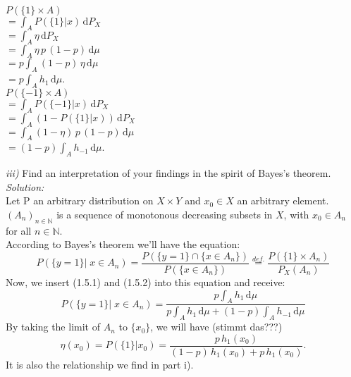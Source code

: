 \documentclass{article}
\begin{document}
\begin{multicols}{2}
\indent \indent \indent $ P( \{1\} \times A ) $ \vspace*{0.5em} \\
\indent \indent $= \displaystyle{ \int_A P(\{1\} | x )\, \text{d}  P_X }$\vspace*{0.5em}\\
\indent \indent $\displaystyle{= \int_A \eta \, \text{d} P_X }$\vspace*{0.5em}\\
\indent \indent $\displaystyle{= \int_A \eta\, p\, (1-p)\, \text{d} \mu }$\vspace*{0.5em}\\
\indent \indent $\displaystyle{= p\int_A (1-p)\, \eta \, \text{d} \mu }$\vspace*{0.5em}\\
\indent \indent $\displaystyle{= p \int_A h_1\, \text{d} \mu } $.\\
\indent \indent \indent  $ P( \{-1\} \times A ) $\vspace*{0.5em}\\
\indent \indent $= \displaystyle{ \int_A P(\{-1\} | x )\, \text{d}  P_X }$\vspace*{0.5em}\\
\indent \indent $= \displaystyle{ \int_A (1-P(\{1\} | x )  ) \, \text{d} P_X }$\vspace*{0.5em}\\
\indent \indent  $= \displaystyle{ \int_A (1- \eta)\, p\, (1-p)\, \text{d} \mu  } $\vspace*{0.5em}\\
\indent \indent $= \displaystyle{ (1-p)\int_A h_{-1} \, \text{d} \mu   }$.\\
\end{multicols}

\noindent\textsl{iii)} Find an interpretation of your findings in the spirit of Bayes's theorem. \\
\textsl{Solution:}\\
Let P an arbitrary distribution on $X \times Y$ and  $x_0 \in X$ an arbitrary element.\\ 
$(A_n)_{n \in \mathbb{N}}$ is a sequence of monotonous decreasing subsets in $X$, with $x_0 \in A_n$ for all $n \in \mathbb{N}$.\\ 
According to Bayes's theorem we'll have the equation: \[P(\{y=1\} |\; x \in A_n ) = \frac{P( \{ y = 1\} \cap \{x \in A_n \})}{P(\{x \in A_n\})} \overset{def.}{=} \frac{P(\{1\} \times A_n)}{P_X(A_n)} \]
Now, we insert (1.5.1) and (1.5.2) into this equation and receive:
\[P(\{y=1\} |\; x \in A_n ) = \frac{ p \displaystyle{\int_A h_{1} \, \text{d}\mu }}{p \displaystyle{\int_A h_{1} \, \text{d}\mu + (1-p)\displaystyle{\int_A h_{-1} \, \text{d}\mu }}} \] 
By taking the limit of $A_n$ to $\{x_0\}$, we will have (stimmt das???)
\[\eta(x_0)=P(\{1\}|x_0) = \frac{p \, h_1(x_0)}{(1-p)\,h_1(x_0) + p\, h_1(x_0)}.\]
It is also the relationship we find in part i).
\end{document}
